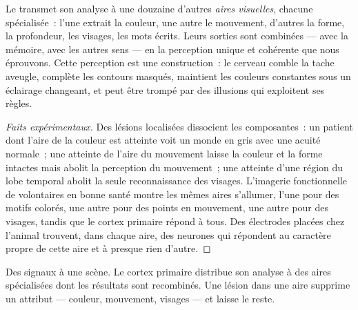 \begin{proposition}\label{prop:g11:vision-and-brain:areas}
Le  transmet son analyse à une douzaine d'autres
\emph{aires visuelles}, chacune spécialisée~: l'une extrait la couleur,
une autre le mouvement, d'autres la forme, la profondeur, les visages,
les mots écrits. Leurs sorties sont combinées --- avec la mémoire, avec
les autres sens --- en la perception unique et cohérente que nous
éprouvons. Cette perception est une construction~: le cerveau comble la
tache aveugle, complète les contours masqués, maintient les couleurs
constantes sous un éclairage changeant, et peut être trompé par des
illusions qui exploitent ses règles.
\end{proposition}
\begin{proof}[Faits expérimentaux]
Des lésions localisées dissocient les composantes~: un patient dont
l'aire de la couleur est atteinte voit un monde en gris avec une
acuité normale~; une atteinte de l'aire du mouvement laisse la couleur
et la forme intactes mais abolit la perception du mouvement~; une
atteinte d'une région du lobe temporal abolit la seule reconnaissance
des visages. L'imagerie fonctionnelle de volontaires en bonne santé
montre les mêmes aires s'allumer, l'une pour des motifs colorés, une
autre pour des points en mouvement, une autre pour des visages, tandis
que le cortex primaire répond à tous. Des électrodes placées chez
l'animal trouvent, dans chaque aire, des neurones qui répondent au
caractère propre de cette aire et à presque rien d'autre.
\end{proof}

\begin{omfigure}

{\small Des signaux à une scène. Le cortex primaire distribue son
analyse à des aires spécialisées dont les résultats sont recombinés.
Une lésion dans une aire supprime un attribut --- couleur, mouvement,
visages --- et laisse le reste.}
\end{omfigure}

